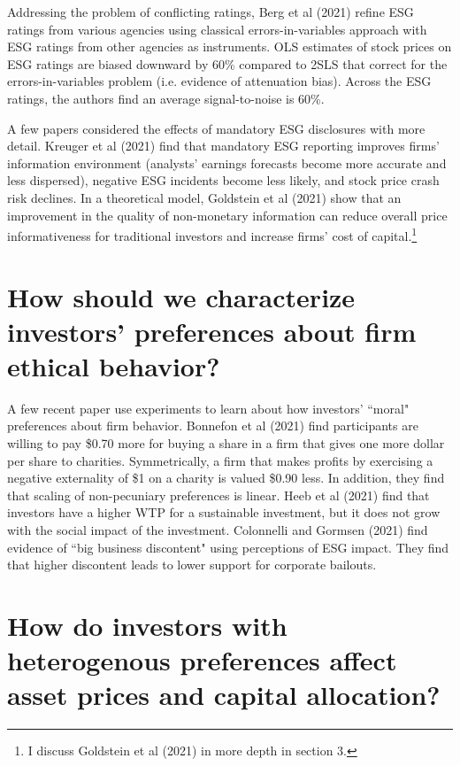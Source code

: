 \documentclass{article}
\begin{document}
\bigskip

Addressing the problem of conflicting ratings, Berg et al (2021) refine ESG ratings from various agencies using classical errors-in-variables approach with ESG ratings from other agencies as instruments. OLS estimates of stock prices on ESG ratings are biased downward by 60\% compared to 2SLS that correct for the errors-in-variables problem (i.e. evidence of attenuation bias). Across the ESG ratings, the authors find an average signal-to-noise is 60\%.

\bigskip

A few papers considered the effects of mandatory ESG disclosures with more detail. Kreuger et al (2021) find that mandatory ESG reporting improves firms' information
environment (analysts' earnings forecasts become more accurate and less dispersed), negative ESG incidents become less likely, and stock price crash risk declines. In a theoretical model, Goldstein et al (2021) show that an improvement in
the quality of non-monetary information can reduce overall price informativeness for traditional investors
and increase firms' cost of capital.\footnote{I discuss Goldstein et al (2021) in more depth in section 3.} 



\section{How should we characterize investors' preferences about firm ethical behavior?}

A few recent paper use experiments to learn about how investors' ``moral" preferences about firm behavior. Bonnefon et al (2021) find participants are willing to pay \$0.70 more for buying a share in a firm that gives one more dollar per share to charities. Symmetrically, a firm that makes profits by exercising a negative externality of \$1 on a charity is valued \$0.90 less. In addition, they find that scaling of non-pecuniary preferences is linear. Heeb et al (2021) find that investors have a higher WTP for a sustainable investment, but it does not grow with the social impact of the investment. Colonnelli and Gormsen (2021) find evidence of ``big business discontent" using perceptions of ESG impact.  They find that higher discontent leads to lower support for corporate bailouts.



\section{How do investors with heterogenous preferences affect asset prices and capital allocation?}
\end{document}
